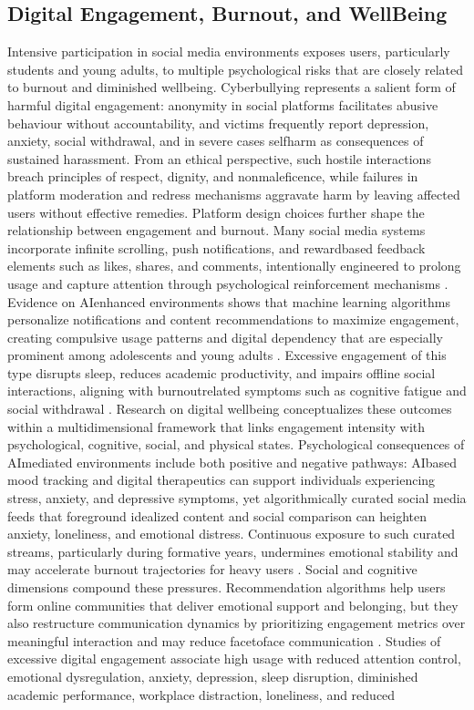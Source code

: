 \documentclass{article}
\begin{document}
\subsection{Digital Engagement, Burnout, and Well\-Being}
\label{sec:digital_engagement_burnout} Intensive participation in social media environments exposes users, particularly students and young adults, to multiple psychological risks that are closely related to burnout and diminished well\-being. Cyberbullying represents a salient form of harmful digital engagement: anonymity in social platforms facilitates abusive behaviour without accountability, and victims frequently report depression, anxiety, social withdrawal, and in severe cases self\-harm as consequences of sustained harassment. From an ethical perspective, such hostile interactions breach principles of respect, dignity, and non\-maleficence, while failures in platform moderation and redress mechanisms aggravate harm by leaving affected users without effective remedies. Platform design choices further shape the relationship between engagement and burnout. Many social media systems incorporate infinite scrolling, push notifications, and reward\-based feedback elements such as likes, shares, and comments, intentionally engineered to prolong usage and capture attention through psychological reinforcement mechanisms \parencites[11]{6644697}. Evidence on AI\-enhanced environments shows that machine learning algorithms personalize notifications and content recommendations to maximize engagement, creating compulsive usage patterns and digital dependency that are especially prominent among adolescents and young adults \parencites[6]{9300898}. Excessive engagement of this type disrupts sleep, reduces academic productivity, and impairs offline social interactions, aligning with burnout\-related symptoms such as cognitive fatigue and social withdrawal \parencites[11]{6644697}[6]{9300898}. Research on digital well\-being conceptualizes these outcomes within a multidimensional framework that links engagement intensity with psychological, cognitive, social, and physical states. Psychological consequences of AI\-mediated environments include both positive and negative pathways: AI\-based mood tracking and digital therapeutics can support individuals experiencing stress, anxiety, and depressive symptoms, yet algorithmically curated social media feeds that foreground idealized content and social comparison can heighten anxiety, loneliness, and emotional distress. Continuous exposure to such curated streams, particularly during formative years, undermines emotional stability and may accelerate burnout trajectories for heavy users \parencites[4]{9300898}. Social and cognitive dimensions compound these pressures. Recommendation algorithms help users form online communities that deliver emotional support and belonging, but they also restructure communication dynamics by prioritizing engagement metrics over meaningful interaction and may reduce face\-to\-face communication \parencites[6]{9300898}. Studies of excessive digital engagement associate high usage with reduced attention control, emotional dysregulation, anxiety, depression, sleep disruption, diminished academic performance, workplace distraction, loneliness, and reduced 
\end{document}
